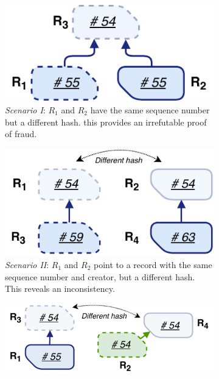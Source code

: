 
\begin{figure}[t!]
	\centering
	\begin{subfigure}[t]{.5\textwidth}
		\centering
		\captionsetup{width=.9\linewidth}
		\includegraphics[width=.75\linewidth]{trustchain/assets/fraud_scenario_1}
		\caption{\emph{Scenario I}: $ R_1 $ and $ R_2 $ have the same sequence number but a different hash. this provides an irrefutable proof of fraud.}
		\label{fig:fraud_scenario_1}
	\end{subfigure}%
	\begin{subfigure}[t]{.5\textwidth}
		\centering
		\captionsetup{width=.89\linewidth}
		\includegraphics[width=.75\linewidth]{trustchain/assets/fraud_scenario_2}
		\caption{\emph{Scenario II}: $ R_1 $ and $ R_2 $ point to a record with the same sequence number and creator, but a different hash. This reveals an inconsistency.}
		\label{fig:fraud_scenario_2}\vspace{0.9cm}
	\end{subfigure}
	\begin{subfigure}[t]{.5\textwidth}
		\centering
		\captionsetup{width=.89\linewidth}
		\includegraphics[width=\linewidth]{trustchain/assets/fraud_scenario_3}

\end{subfigure}
\end{figure}
